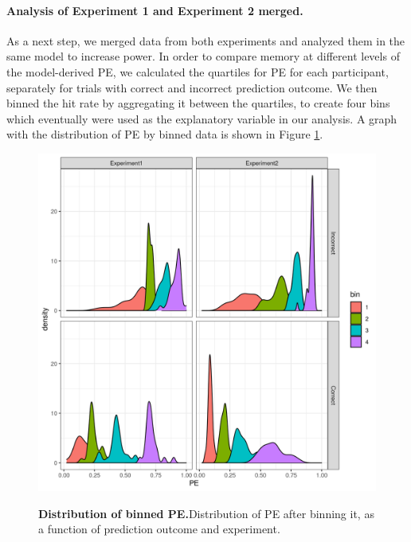 \documentclass[a4paper,12pt]{article} 			%
\begin{document}
\paragraph{Analysis of Experiment 1 and Experiment 2 merged.}
As a next step, we merged data from both experiments and analyzed them in the same model to increase power. In order to compare memory at different levels of the model-derived PE, we calculated the quartiles for PE for each participant, separately for trials with correct and incorrect prediction outcome. We then binned the hit rate by aggregating it between the quartiles, to create four bins which eventually were used as the explanatory variable in our analysis. A graph with the distribution of PE by binned data is shown in Figure \ref{fig:PEbin_distr}.

\begin{figure}[ht!]
{\includegraphics[width=1\textwidth]{figures/PEdistr_binned.png}}
\caption{\textbf{Distribution of binned PE.}Distribution of PE after binning it, as a function of prediction outcome and experiment. }
\label{fig:PEbin_distr}

\end{figure}
\end{document}

